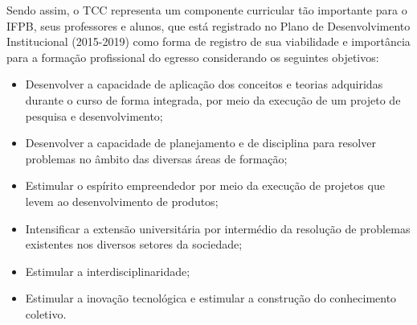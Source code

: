 
Sendo assim, o TCC representa um componente curricular tão importante para o IFPB, seus professores e alunos, que está registrado no Plano de Desenvolvimento Institucional (2015-2019) como forma de registro de sua viabilidade e importância para a formação profissional do egresso considerando os seguintes objetivos:

\begin{itemize}
	\item Desenvolver a capacidade de aplicação dos conceitos e teorias adquiridas durante o curso de forma integrada, por meio da execução de um projeto de pesquisa e desenvolvimento;
	\item Desenvolver a capacidade de planejamento e de disciplina para resolver problemas no âmbito das diversas áreas de formação;
	\item Estimular o espírito empreendedor por meio da execução de projetos que levem ao desenvolvimento de produtos;
	\item Intensificar a extensão universitária por intermédio da resolução de problemas existentes nos diversos setores da sociedade;
	\item Estimular a interdisciplinaridade; 
	\item Estimular a inovação tecnológica e estimular a construção do conhecimento coletivo.
\end{itemize}


